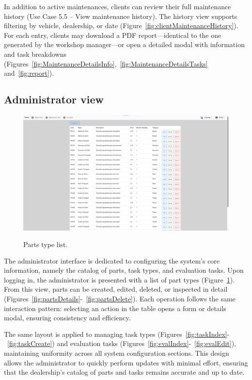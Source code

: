 In addition to active maintenances, clients can review their full maintenance history (Use Case 5.5 – View maintenance history). The history view supports filtering by vehicle, dealership, or date (Figure~\ref{fig:clientMaintenanceHistory}). For each entry, clients may download a PDF report—identical to the one generated by the workshop manager—or open a detailed modal with information and task breakdowns (Figures~\ref{fig:MaintenanceDetailsInfo},~\ref{fig:MaintenanceDetailsTasks} and~\ref{fig:report}).



\subsection{Administrator view}


\begin{figure}[h]
  \caption{Parts type list.}
  \centering
  \includegraphics[width=\textwidth]{figs/Implementation/dealershipAdmin/partsIndex}
  \label{fig:partsIndex}
\end{figure}



The administrator interface is dedicated to configuring the system's core information, namely the catalog of parts, task types, and evaluation tasks. Upon logging in, the administrator is presented with a list of part types (Figure~\ref{fig:partsIndex}). From this view, parts can be created, edited, deleted, or inspected in detail (Figures~\ref{fig:partsDetails}-~\ref{fig:partsDelete}). Each operation follows the same interaction pattern: selecting an action in the table opens a form or details modal, ensuring consistency and efficiency.




The same layout is applied to managing task types (Figures~\ref{fig:taskIndex}-~\ref{fig:taskCreate}) and evaluation tasks (Figures~\ref{fig:evalIndex}-~\ref{fig:evalEdit}), maintaining uniformity across all system configuration sections. This design allows the administrator to quickly perform updates with minimal effort, ensuring that the dealership's catalog of parts and tasks remains accurate and up to date.


